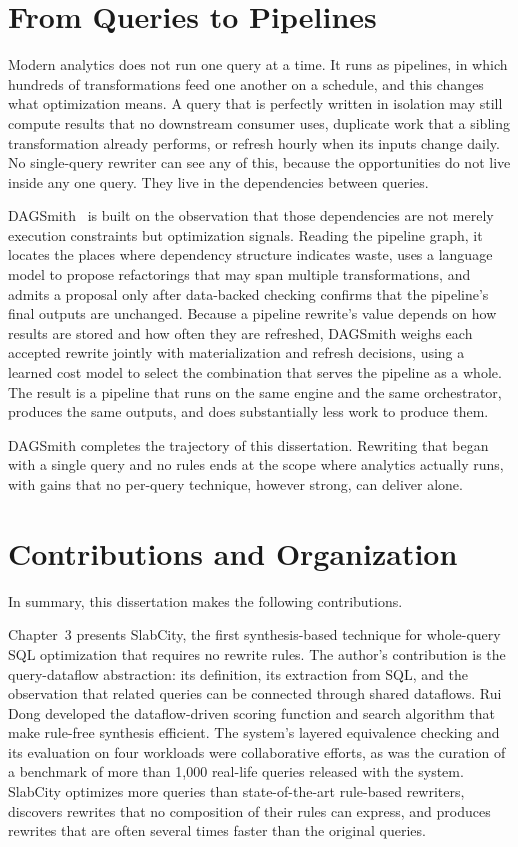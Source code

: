 \section{From Queries to Pipelines}
\label{sec:intro:pipelines}

Modern analytics does not run one query at a time. It runs as
pipelines, in which hundreds of transformations feed one another on a
schedule, and this changes what optimization means. A query that is
perfectly written in isolation may still compute results that no
downstream consumer uses, duplicate work that a sibling transformation
already performs, or refresh hourly when its inputs change daily. No
single-query rewriter can see any of this, because the opportunities do
not live inside any one query. They live in the dependencies between
queries.

DAGSmith~\cite{dagsmith-arxiv} is built on the observation that those
dependencies are not merely execution constraints but optimization
signals. Reading the
pipeline graph, it locates the places where dependency structure
indicates waste, uses a language model to propose refactorings that may
span multiple transformations, and admits a proposal only after
data-backed checking confirms that the pipeline's final outputs are
unchanged. Because a pipeline rewrite's value depends on how results
are stored and how often they are refreshed, DAGSmith weighs each
accepted rewrite jointly with materialization and refresh decisions,
using a learned cost model to select the combination that serves the
pipeline as a whole. The result is a pipeline that runs on the same
engine and the same orchestrator, produces the same outputs, and does
substantially less work to produce them.

DAGSmith completes the trajectory of this dissertation. Rewriting that
began with a single query and no rules ends at the scope where analytics
actually runs, with gains that no per-query technique, however strong,
can deliver alone.

\section{Contributions and Organization}
\label{sec:intro:contributions}

In summary, this dissertation makes the following contributions.

Chapter~3 presents SlabCity, the first synthesis-based technique for
whole-query SQL optimization that requires no rewrite rules. The
author's contribution is the query-dataflow abstraction: its
definition, its extraction from SQL, and the observation that related
queries can be connected through shared dataflows. Rui Dong developed
the dataflow-driven scoring function and search algorithm that make
rule-free synthesis efficient. The system's layered equivalence
checking and its evaluation on four workloads were collaborative
efforts, as was the curation of a benchmark of more than 1{,}000
real-life queries released with the system. SlabCity optimizes more queries than state-of-the-art
rule-based rewriters, discovers rewrites that no composition of their
rules can express, and produces rewrites that are often several times
faster than the original queries.

